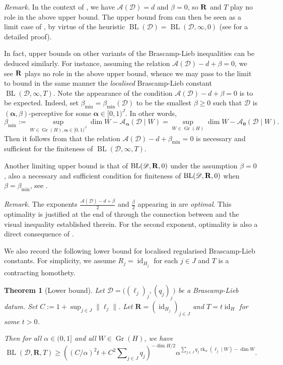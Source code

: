\documentclass[a4paper,english]{amsart}
\newtheorem{thm}{Theorem}[section]
\theoremstyle{definition}
\newenvironment{remark}{\par\medskip \noindent \textit{Remark.} \rmfamily}{\medskip}
\newcommand{\bba}{\boldsymbol{\alpha}}
\newcommand{\1}{\mathbbm{1}}
\newcommand{\bbR}{{\bf{R}}}
\newcommand{\sD} {{\mathscr D}}
\newcommand{\sA}{\mathscr{A}}
\newcommand{\bR}{\mathbf{R}}
\DeclareMathOperator{\id}{id}
\DeclareMathOperator{\rk}{rk}
\DeclareMathOperator{\Gr}{Gr}
\DeclareMathOperator{\BL}{BL}
\begin{document}
\begin{remark} In the context of , we have $\sA(\sD)=d$ and $\beta=0$, so $\bbR$ and $T$ play no role in the above upper bound.
The upper bound from  can then be seen as a limit case of , by virtue of the heuristic $\BL(\sD)=\BL(\sD, \infty, 0)$ (see  for a detailed proof).


In fact, upper bounds on other variants of the Brascamp-Lieb inequalities can be deduced similarly. For instance, assuming the relation $\sA(\sD)-d+\beta=0$, we see $\bbR$ plays no role in the above upper bound, whence we may pass to the limit to bound in the same manner the \emph{localised} Brascamp-Lieb constant $\BL(\sD, \infty, T)$.
Note the appearance of the condition $\sA(\sD)-d+\beta=0$ is to be expected.
Indeed, set $\beta_{\min}=\beta_{\min}(\sD)$ to be the smallest $\beta\geq0$ such that $\sD$ is $(\bba, \beta)$-perceptive for some $\bba \in [0,1)^J$.
In other words,
\[
\beta_{\min} := \sup_{W \in \Gr(H), \bba \in [0,1)^J} \dim W - \sA_{\bba}(\sD \mid W) = \sup_{W \in \Gr(H)} \dim W - \sA_{\mathbf{0}}(\sD \mid W).
\]
Then it follows from \cite[Theorem 2.2]{BCCT10} that the relation $\sA(\sD)-d+\beta_{\min}=0$
is necessary and sufficient for the finiteness of $\BL(\sD, \infty, T)$.

Another limiting upper bound is that of $\BL(\sD, \bbR, 0)$ under the assumption $\beta=0$, also a necessary and sufficient condition for finiteness of $\BL(\sD, \bbR, 0)$ when $\beta=\beta_{\min}$, see \cite{BCCT10, Maldague22}.
\end{remark}

\begin{remark}
 The exponents $\frac{\sA(\sD)-d+\beta}{2}$ and $\frac{\beta}{2}$ appearing in   are \emph{optimal}. This optimality is justified at the end of  through the connection between  and the visual inequality established therein. For the second exponent, optimality is also a direct consequence   of \cite[Theorem 1 (lower bound)]{Maldague22}.
\end{remark}

We also record the following lower bound for localised regularised Brascamp-Lieb constants. For simplicity, we  assume  $R_j = \id_{H_j}$ for each $j \in J$ and $T$ is a contracting homothety.
\begin{thm}[Lower bound]\label{thm:loc-lb}
Let $\sD = \bigl( (\ell_j)_j, (q_j)_j \bigr)$ be a Brascamp-Lieb datum. Set $C:=1+\sup_{j\in J} \|\ell_{j}\|$.
Let $\bR = (\id_{H_j})_{j \in J}$ and $T = t \id_H$ for some $t>0$.

Then for all $\alpha \in (0, 1]$ and all $W \in \Gr(H)$, we have
\[
\BL( \sD, \bR, T) \geq \left( (C/\alpha)^2 t+ C^2\sum\nolimits_{j \in J} q_j \right)^{-\dim H / 2} \alpha^{\sum_{j \in J} q_j \rk_{\alpha}(\ell_j \mid W) - \dim W}.
\]
\end{thm}
\end{document}
